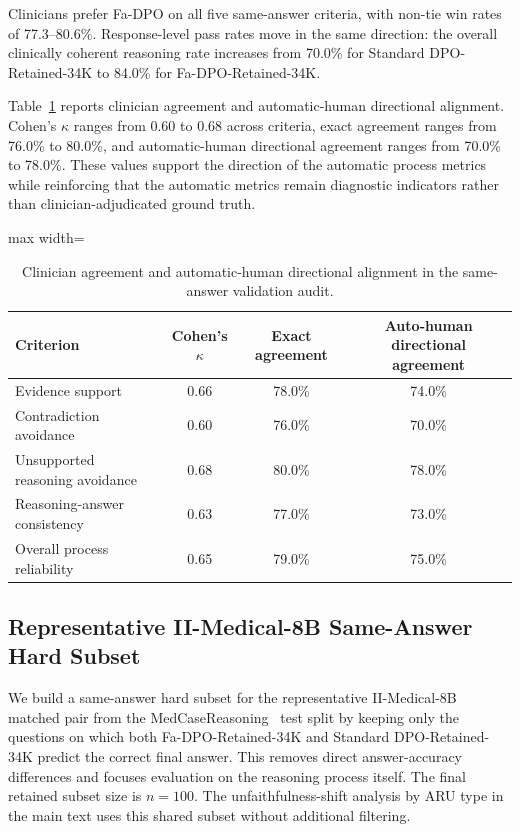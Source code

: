 \documentclass[a4paper,fleqn,doubleblind]{cas-sc}
\begin{document}
Clinicians prefer Fa-DPO on all five same-answer criteria, with non-tie win rates of 77.3--80.6\%. Response-level pass rates move in the same direction: the overall clinically coherent reasoning rate increases from 70.0\% for Standard DPO-Retained-34K to 84.0\% for Fa-DPO-Retained-34K.

Table~\ref{tab:same_answer_clinician_alignment} reports clinician agreement and automatic-human directional alignment. Cohen's $\kappa$ ranges from 0.60 to 0.68 across criteria, exact agreement ranges from 76.0\% to 80.0\%, and automatic-human directional agreement ranges from 70.0\% to 78.0\%. These values support the direction of the automatic process metrics while reinforcing that the automatic metrics remain diagnostic indicators rather than clinician-adjudicated ground truth.

\begin{table}[htbp]
    \centering
    \footnotesize
    \caption{Clinician agreement and automatic-human directional alignment in the same-answer validation audit.}
    \label{tab:same_answer_clinician_alignment}
    \begin{adjustbox}{max width=\columnwidth}
    \begin{tabular}{lccc}
        \toprule
        \textbf{Criterion} & \textbf{Cohen's $\kappa$} & \textbf{Exact agreement} & \textbf{Auto-human directional agreement} \\
        \midrule
        Evidence support & 0.66 & 78.0\% & 74.0\% \\
        Contradiction avoidance & 0.60 & 76.0\% & 70.0\% \\
        Unsupported reasoning avoidance & 0.68 & 80.0\% & 78.0\% \\
        Reasoning-answer consistency & 0.63 & 77.0\% & 73.0\% \\
        Overall process reliability & 0.65 & 79.0\% & 75.0\% \\
        \bottomrule
    \end{tabular}
    \end{adjustbox}
\end{table}

\subsection{Representative II-Medical-8B Same-Answer Hard Subset}
\label{app:same_answer_subset}

We build a same-answer hard subset for the representative II-Medical-8B~\cite{intelligentinternet2025iimedical8b} matched pair from the MedCaseReasoning~\cite{wu2025medcasereasoning} test split by keeping only the questions on which both Fa-DPO-Retained-34K and Standard DPO-Retained-34K predict the correct final answer. This removes direct answer-accuracy differences and focuses evaluation on the reasoning process itself. The final retained subset size is $n=100$. The unfaithfulness-shift analysis by ARU type in the main text uses this shared subset without additional filtering.
\end{document}
